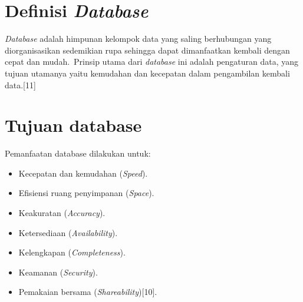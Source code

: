 \section{Definisi \textit{Database}}
\textit{Database} adalah himpunan kelompok data yang saling berhubungan yang diorganisasikan sedemikian rupa sehingga dapat dimanfaatkan kembali dengan cepat dan mudah. Prinsip utama dari \textit{database} ini adalah pengaturan data, yang tujuan utamanya yaitu kemudahan dan kecepatan dalam pengambilan kembali data.[11]

\section{Tujuan database}
Pemanfaatan database dilakukan untuk:
\begin{itemize}
	\item Kecepatan dan kemudahan (\textit{Speed}).
	\item Efisiensi ruang penyimpanan (\textit{Space}).
	\item Keakuratan (\textit{Accuracy}).
	\item Ketersediaan (\textit{Availability}).
	\item Kelengkapan (\textit{Completeness}).
	\item Keamanan (\textit{Security}).
	\item Pemakaian bersama (\textit{Shareability})[10].
\end{itemize}

